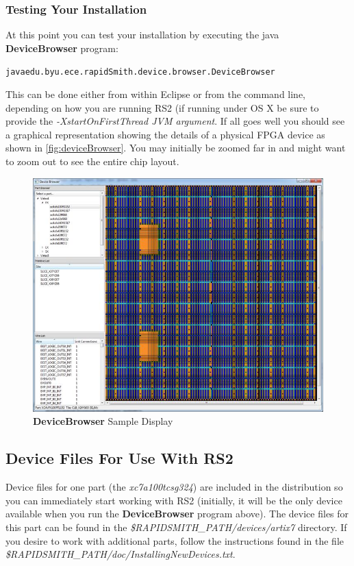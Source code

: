 \documentclass[10pt]{article}
\newcommand{\fil}[1]{{\em #1}}
\newcommand{\opt}[1]{{\em #1}}
\newcommand{\pgm}[1]{{\textbf{#1}}}
\newcommand{\dir}[1]{{\em #1}}
\newenvironment{code}{\begin{center} \begin{minipage}{6in} \noindent \begin{alltt}}{\end{alltt} \end{minipage} \end{center}}
\begin{document}
\subsubsection{Testing Your Installation}
\noindent At this point you can test your installation by executing the java
\pgm{DeviceBrowser} program: 
\vspace{-0.15in}  \begin{code}
java edu.byu.ece.rapidSmith.device.browser.DeviceBrowser
\end{code}    

\noindent This can be done either from within Eclipse or from the command line,
depending on how you are running RS2 (if running under OS X be sure to provide the
\opt{-XstartOnFirstThread JVM argument}. If all goes well you should see a
graphical representation showing the details of a physical FPGA device as shown
in \autoref{fig:deviceBrowser}.  You may initially be zoomed far in and might
want to zoom out to see the entire chip layout.

\begin{figure}[H]
\centering
\includegraphics[width=0.8\columnwidth]{deviceBrowser}
\caption{\pgm{DeviceBrowser} Sample Display}
\label{fig:deviceBrowser}
\end{figure}

\subsection{Device Files For Use With RS2}
Device files for one part (the {\em xc7a100tcsg324}) are included in the
distribution so you can immediately start working with RS2 (initially, it
will be the only device available when you run the \pgm{DeviceBrowser} program
above).  The device files for this part can be found in the
\dir{\${RAPIDSMITH\_PATH}/devices/artix7} directory. If you desire to work with
additional parts, follow the instructions found in the file
\fil{\$RAPIDSMITH\_PATH/\-doc/Installing\-NewDevices.txt}.
\end{document}
